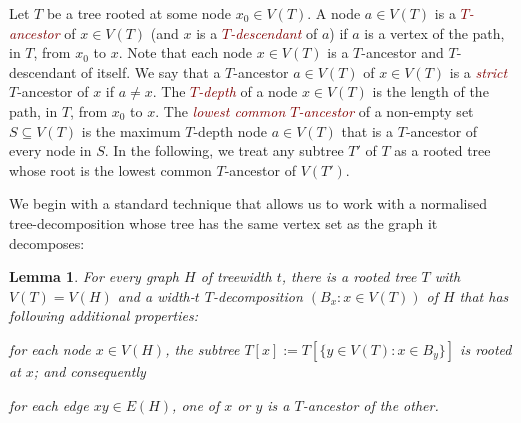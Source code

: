 \documentclass{patmorin}
\theoremstyle{plain}
\newtheorem{lem}[thm]{Lemma}
\theoremstyle{definition}
\newcommand{\defin}[1]{\textcolor{Maroon}{\emph{#1}}}
\newcommand{\tlabel}[1]{\label{t:#1}}
\begin{document}
Let $T$ be a tree rooted at some node $x_0\in V(T)$.  A node $a\in V(T)$ is a \defin{$T$-ancestor} of $x\in V(T)$ (and $x$ is a \defin{$T$-descendant} of $a$) if $a$ is a vertex of the path, in $T$, from $x_0$ to $x$.  Note that each node $x\in V(T)$ is a $T$-ancestor and $T$-descendant of itself.  We say that a $T$-ancestor $a\in V(T)$ of $x\in V(T)$ is a \defin{strict} $T$-ancestor of $x$ if $a\neq x$.
The \defin{$T$-depth} of a node $x\in V(T)$ is the length of the path, in $T$, from $x_0$ to $x$.  The \defin{lowest common $T$-ancestor} of a non-empty set $S\subseteq V(T)$ is the maximum $T$-depth node $a\in V(T)$ that is a $T$-ancestor of every node in $S$.  In the following, we treat any subtree $T'$ of $T$ as a rooted tree whose root is the lowest common $T$-ancestor of $V(T')$.

We begin with a standard technique that allows us to work with a normalised tree-decomposition whose tree has the same vertex set as the graph it decomposes:

\begin{lem}\label{nice-decomposition}
  For every graph $H$ of treewidth $t$, there is a rooted tree $T$ with $V(T)=V(H)$ and a width-$t$ $T$-decomposition $(B_x:x\in V(T))$ of $H$ that has following additional properties:
  \begin{compactenum}[(T1)]
    \item\tlabel{subtree-root} for each node $x\in V(H)$, the subtree $T[x]:=T[\{y\in V(T):x\in B_y\}]$ is rooted at $x$; and consequently
    \item\tlabel{ancestor-edge}\tlabel{last} for each edge $xy\in E(H)$, one of $x$ or $y$ is a $T$-ancestor of the other.
  \end{compactenum}
\end{lem}
\end{document}
